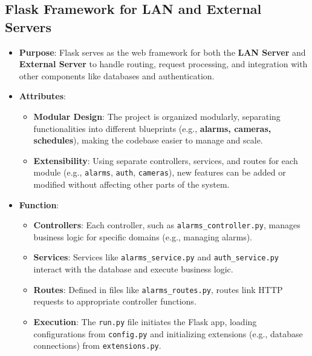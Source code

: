 \documentclass{article}
\begin{document}
\subsection{Flask Framework for LAN and External Servers}
\begin{itemize}
    \item \textbf{Purpose}: Flask serves as the web framework for both the \textbf{LAN Server} and \textbf{External Server} to handle routing, request processing, and integration with other components like databases and authentication.
    \item \textbf{Attributes}:
    \begin{itemize}
        \item \textbf{Modular Design}: The project is organized modularly, separating functionalities into different blueprints (e.g., \textbf{alarms, cameras, schedules}), making the codebase easier to manage and scale.
        \item \textbf{Extensibility}: Using separate controllers, services, and routes for each module (e.g., \texttt{alarms}, \texttt{auth}, \texttt{cameras}), new features can be added or modified without affecting other parts of the system.
    \end{itemize}
    \item \textbf{Function}:
    \begin{itemize}
        \item \textbf{Controllers}: Each controller, such as \texttt{alarms\_controller.py}, manages business logic for specific domains (e.g., managing alarms).
        \item \textbf{Services}: Services like \texttt{alarms\_service.py} and \texttt{auth\_service.py} interact with the database and execute business logic.
        \item \textbf{Routes}: Defined in files like \texttt{alarms\_routes.py}, routes link HTTP requests to appropriate controller functions.
        \item \textbf{Execution}: The \texttt{run.py} file initiates the Flask app, loading configurations from \texttt{config.py} and initializing extensions (e.g., database connections) from \texttt{extensions.py}.
    \end{itemize}
\end{itemize}
\end{document}

